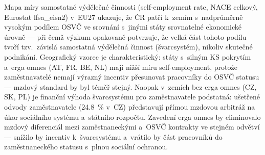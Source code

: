 Mapa míry samostatné výdělečné činnosti (self-employment rate, \ac{NACE} celkový, Eurostat lfsa\_eisn2) v~EU27 ukazuje, že ČR patří k~zemím s~nadprůměrně vysokým podílem \ac{OSVČ} ve srovnání s~jinými státy srovnatelné ekonomické úrovně --- při čemž výzkum opakovaně potvrzuje, že velká část tohoto podílu tvoří tzv.~závislá samostatná výdělečná činnost (švarcsystém), nikoliv skutečné podnikání.
Geografický vzorec je charakteristický: státy s~silným \ac{KS} pokrytím a~erga omnes (AT, FR, BE, NL) mají nižší míru self-employment, protože zaměstnavatelé nemají výrazný incentiv přesunovat pracovníky do \ac{OSVČ} statusu --- mzdový standard by byl téměř stejný.
Naopak v~zemích bez erga omnes (CZ, SK, PL) je finanční výhoda švarcsystému pro zaměstnavatele podstatná: ušetřené odvody zaměstnavatele (\SI{24.8}{\percent} v~CZ) představují přímou mzdovou arbitráž na úkor sociálního systému a~státního rozpočtu.
Zavedení erga omnes by eliminovalo mzdový diferenciál mezi zaměstnaneckými a~\ac{OSVČ} kontrakty ve stejném odvětví --- snížilo by incentiv k~švarcsystému a~vrátilo by část pracovníků do zaměstnaneckého statusu s~plnou sociální ochranou.


